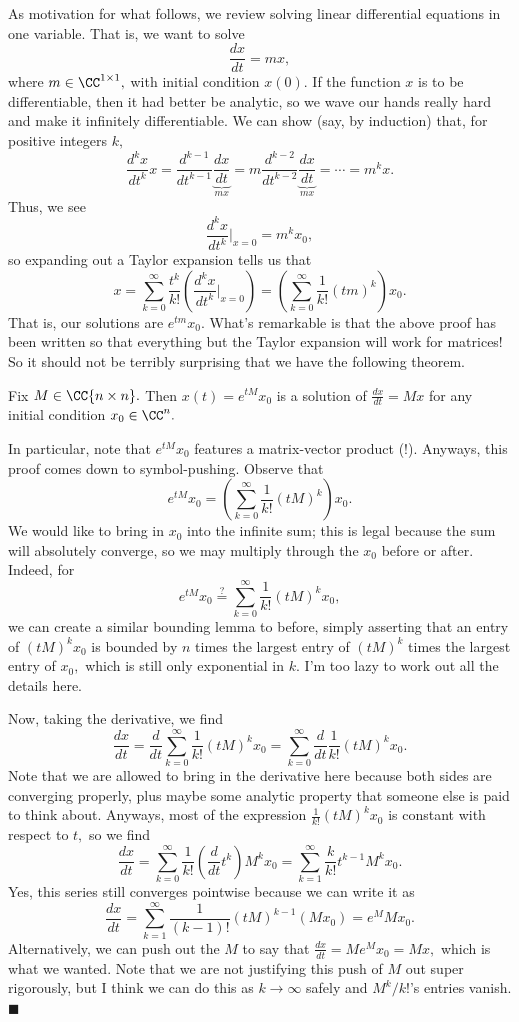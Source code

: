 As motivation for what follows, we review solving linear differential equations in one variable. That is, we want to solve
\[\frac{dx}{dt}=mx,\]
where $m\in\CC^{1\times1},$ with initial condition $x(0).$ If the function $x$ is to be differentiable, then it had better be analytic, so we wave our hands really hard and make it infinitely differentiable. We can show (say, by induction) that, for positive integers $k,$
\[\frac{d^kx}{dt^k}x=\frac{d^{k-1}}{dt^{k-1}}\underbrace{\frac{dx}{dt}}_{mx}=m\frac{d^{k-2}}{dt^{k-2}}\underbrace{\frac{dx}{dt}}_{mx}=\cdots=m^kx.\]
Thus, we see
\[\frac{d^kx}{dt^k}\bigg|_{x=0}=m^kx_0,\]
so expanding out a Taylor expansion tells us that
\[x=\sum_{k=0}^\infty\frac{t^k}{k!}\left(\frac{d^kx}{dt^k}\bigg|_{x=0}\right)=\left(\sum_{k=0}^\infty\frac1{k!}(tm)^k\right)x_0.\]
That is, our solutions are $e^{tm}x_0.$ What's remarkable is that the above proof has been written so that everything but the Taylor expansion will work for matrices! So it should not be terribly surprising that we have the following theorem.
\begin{theorem}
    Fix $M\in\CC{n\times n}.$ Then $x(t)=e^{tM}x_0$ is a solution of $\frac{dx}{dt}=Mx$ for any initial condition $x_0\in\CC^n.$
\end{theorem}
In particular, note that $e^{tM}x_0$ features a matrix-vector product (!). Anyways, this proof comes down to symbol-pushing. Observe that
\[e^{tM}x_0=\left(\sum_{k=0}^\infty\frac1{k!}(tM)^k\right)x_0.\]
We would like to bring in $x_0$ into the infinite sum; this is legal because the sum will absolutely converge, so we may multiply through the $x_0$ before or after. Indeed, for
\[e^{tM}x_0\stackrel?=\sum_{k=0}^\infty\frac1{k!}(tM)^kx_0,\]
we can create a similar bounding lemma to before, simply asserting that an entry of $(tM)^kx_0$ is bounded by $n$ times the largest entry of $(tM)^k$ times the largest entry of $x_0,$ which is still only exponential in $k.$ I'm too lazy to work out all the details here.

Now, taking the derivative, we find
\[\frac{dx}{dt}=\frac d{dt}\sum_{k=0}^\infty\frac1{k!}(tM)^kx_0=\sum_{k=0}^\infty\frac d{dt}\frac1{k!}(tM)^kx_0.\]
Note that we are allowed to bring in the derivative here because both sides are converging properly, plus maybe some analytic property that someone else is paid to think about. Anyways, most of the expression $\frac1{k!}(tM)^kx_0$ is constant with respect to $t,$ so we find
\[\frac{dx}{dt}=\sum_{k=0}^\infty\frac1{k!}\left(\frac d{dt}t^k\right)M^kx_0=\sum_{k=1}^\infty\frac k{k!}t^{k-1}M^kx_0.\]
Yes, this series still converges pointwise because we can write it as
\[\frac{dx}{dt}=\sum_{k=1}^\infty\frac1{(k-1)!}(tM)^{k-1}(Mx_0)=e^MMx_0.\]
Alternatively, we can push out the $M$ to say that $\frac{dx}{dt}=Me^Mx_0=Mx,$ which is what we wanted. Note that we are not justifying this push of $M$ out super rigorously, but I think we can do this as $k\to\infty$ safely and $M^k/k!$'s entries vanish. $\blacksquare$

